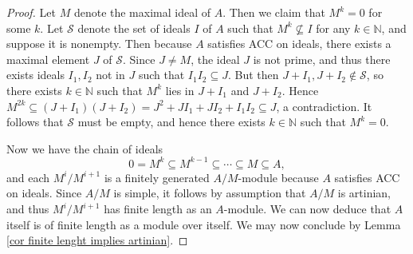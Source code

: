 \documentclass[11pt]{amsart}
\def\N{\mathbb{N}}
\def\sub{\subseteq}
\theoremstyle{definition}
\theoremstyle{remark}
\numberwithin{equation}{section}
\begin{document}
\begin{proof}
    Let $M$ denote the maximal ideal of $A$.  Then we claim that $M^k=0$ for some $k$.  Let $\mathcal{S}$ denote the set of ideals $I$ of $A$ such that $M^k\not\subseteq I$ for any $k\in\N$, and suppose it is nonempty.  Then because $A$ satisfies ACC on ideals, there exists a maximal element $J$ of $\mathcal{S}$.  Since $J\neq M$, the ideal $J$ is not prime, and thus there exists ideals $I_1,I_2$ not in $J$ such that $I_1I_2\subseteq J$.  But then $J+I_1,J+I_2\notin\mathcal{S}$, so there exists $k\in\N$ such that $M^k$ lies in $J+I_1$ and $J+I_2$.  Hence $M^{2k}\sub(J+I_1)(J+I_2)=J^2+JI_1+JI_2+I_1I_2\sub J$, a contradiction.  It follows that $\mathcal{S}$ must be empty, and hence there exists $k\in\N$ such that $M^k=0$.

    Now we have the chain of ideals
    \[
    0=M^k\sub M^{k-1}\sub\cdots\sub M \sub A,
    \]
    and each $M^i/M^{i+1}$ is a finitely generated $A/M$-module because $A$ satisfies ACC on ideals.  Since $A/M$ is simple, it follows by assumption that $A/M$ is artinian, and thus $M^i/M^{i+1}$ has finite length as an $A$-module.  We can now deduce that $A$ itself is of finite length as a module over itself.  
    We may now conclude by Lemma \ref{cor finite lenght implies artinian}.    
\end{proof}
\end{document}
